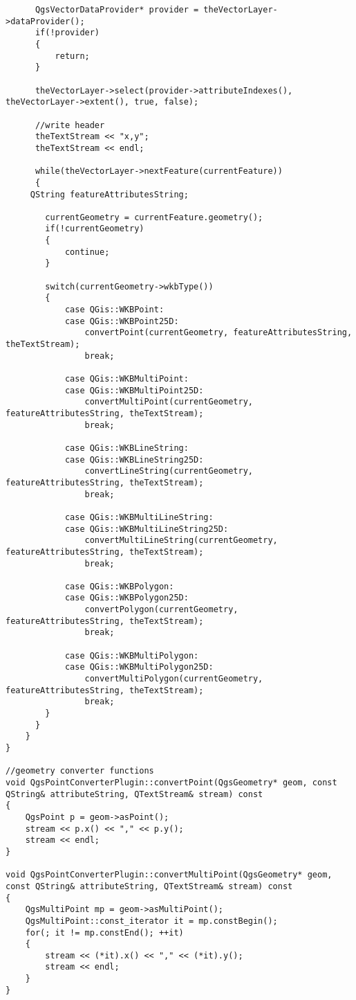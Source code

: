 \begin{verbatim}
      QgsVectorDataProvider* provider = theVectorLayer->dataProvider();
      if(!provider)
      {
          return;
      }

      theVectorLayer->select(provider->attributeIndexes(), theVectorLayer->extent(), true, false);

      //write header
      theTextStream << "x,y";
      theTextStream << endl;

      while(theVectorLayer->nextFeature(currentFeature))
      {
	 QString featureAttributesString;
      
        currentGeometry = currentFeature.geometry();
        if(!currentGeometry)
        {
            continue;
        }

        switch(currentGeometry->wkbType())
        {
            case QGis::WKBPoint:
            case QGis::WKBPoint25D:
                convertPoint(currentGeometry, featureAttributesString, theTextStream);
                break;

            case QGis::WKBMultiPoint:
            case QGis::WKBMultiPoint25D:
                convertMultiPoint(currentGeometry, featureAttributesString, theTextStream);
                break;

            case QGis::WKBLineString:
            case QGis::WKBLineString25D:
                convertLineString(currentGeometry, featureAttributesString, theTextStream);
                break;

            case QGis::WKBMultiLineString:
            case QGis::WKBMultiLineString25D:
                convertMultiLineString(currentGeometry, featureAttributesString, theTextStream);
                break;

            case QGis::WKBPolygon:
            case QGis::WKBPolygon25D:
                convertPolygon(currentGeometry, featureAttributesString, theTextStream);
                break;

            case QGis::WKBMultiPolygon:
            case QGis::WKBMultiPolygon25D:
                convertMultiPolygon(currentGeometry, featureAttributesString, theTextStream);
                break;
        }
      }
    }
}

//geometry converter functions
void QgsPointConverterPlugin::convertPoint(QgsGeometry* geom, const QString& attributeString, QTextStream& stream) const
{
    QgsPoint p = geom->asPoint();
    stream << p.x() << "," << p.y();
    stream << endl;
}

void QgsPointConverterPlugin::convertMultiPoint(QgsGeometry* geom, const QString& attributeString, QTextStream& stream) const
{
    QgsMultiPoint mp = geom->asMultiPoint();
    QgsMultiPoint::const_iterator it = mp.constBegin();
    for(; it != mp.constEnd(); ++it)
    {
        stream << (*it).x() << "," << (*it).y();
        stream << endl;
    }
}


\end{verbatim}
